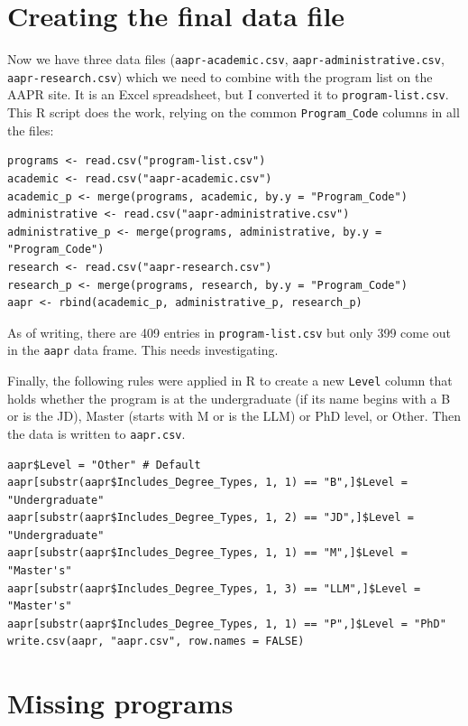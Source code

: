 \documentclass[article,10pt,microtype]{article}
\begin{document}
\section*{Creating the final data file}
\label{sec-4}

Now we have three data files (\texttt{aapr-academic.csv}, \texttt{aapr-administrative.csv}, \texttt{aapr-research.csv}) which we need to combine with the program list on the AAPR site.  It is an Excel spreadsheet, but I converted it to \texttt{program-list.csv}.  This R script does the work, relying on the common \texttt{Program\_Code} columns in all the files:

\begin{verbatim}
programs <- read.csv("program-list.csv")
academic <- read.csv("aapr-academic.csv")
academic_p <- merge(programs, academic, by.y = "Program_Code")
administrative <- read.csv("aapr-administrative.csv")
administrative_p <- merge(programs, administrative, by.y = "Program_Code")
research <- read.csv("aapr-research.csv")
research_p <- merge(programs, research, by.y = "Program_Code")
aapr <- rbind(academic_p, administrative_p, research_p)
\end{verbatim}

As of writing, there are 409 entries in \texttt{program-list.csv} but only 399 come out in the \texttt{aapr} data frame.  This needs investigating.

Finally, the following rules were applied in R to create a new \texttt{Level} column that holds whether the program is at the undergraduate (if its name begins with a B or is the JD), Master (starts with M or is the LLM) or PhD level, or Other.  Then the data is written to \texttt{aapr.csv}.

\begin{verbatim}
aapr$Level = "Other" # Default
aapr[substr(aapr$Includes_Degree_Types, 1, 1) == "B",]$Level = "Undergraduate"
aapr[substr(aapr$Includes_Degree_Types, 1, 2) == "JD",]$Level = "Undergraduate"
aapr[substr(aapr$Includes_Degree_Types, 1, 1) == "M",]$Level = "Master's"
aapr[substr(aapr$Includes_Degree_Types, 1, 3) == "LLM",]$Level = "Master's"
aapr[substr(aapr$Includes_Degree_Types, 1, 1) == "P",]$Level = "PhD"
write.csv(aapr, "aapr.csv", row.names = FALSE)
\end{verbatim}

\section*{Missing programs}
\label{sec-5}
\end{document}
